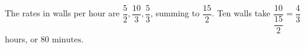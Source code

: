 The rates in walls per hour are $\dfrac{5}{2},\dfrac{10}{3},\dfrac{5}{3}$, summing to $\dfrac{15}{2}$. Ten walls take $\dfrac{10}{\dfrac{15}{2}}=\dfrac{4}{3}$ hours, or $\boxed{80\text{ minutes}}$.
